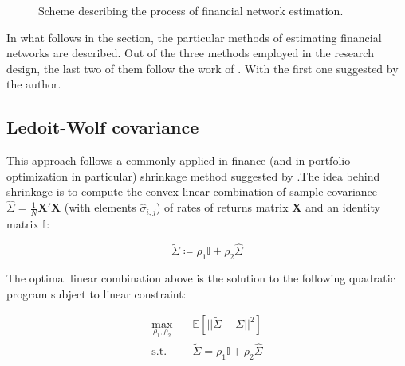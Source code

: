 \documentclass[12pt]{article}
\begin{document}
\begin{figure}
	\caption{Scheme describing the process of financial network estimation.}
	\label{fig:connectedness_scheme}
\end{figure}

In what follows in the section, the particular methods of estimating financial networks are described. Out of the three methods employed in the research design, the last two of them follow the work of \cite{billio12}. With the first one suggested by the author. 

\subsection{Ledoit-Wolf covariance}\label{subsection:ledoit_wolf}

This approach follows a commonly applied in finance (and in portfolio optimization in particular) shrinkage method suggested by \cite{ledoit03}.The idea behind shrinkage is to compute the convex linear combination of sample covariance $\hat{\Sigma} = \frac{1}{N}\boldsymbol{X}'\boldsymbol{X}$ (with elements $\hat{\sigma}_{i,j}$) of rates of returns matrix $\boldsymbol{X}$ and an identity matrix $\mathbb{I}$:

\begin{equation}
	\tilde{\Sigma} \coloneqq \rho_1 \mathbb{I} + \rho_2 \hat{\Sigma}
\end{equation}

The optimal linear combination above is the solution to the following quadratic program subject to linear constraint:

\begin{equation}
	\begin{aligned}
	\max_{\rho_1, \rho_2} \quad &  \mathbb{E}[|| \tilde{\Sigma} - \Sigma||^2] \\
	\textrm{s.t.} \quad & \tilde{\Sigma} = \rho_1 \mathbb{I} + \rho_2 \hat{\Sigma}
	\end{aligned}
\end{equation}
\end{document}
